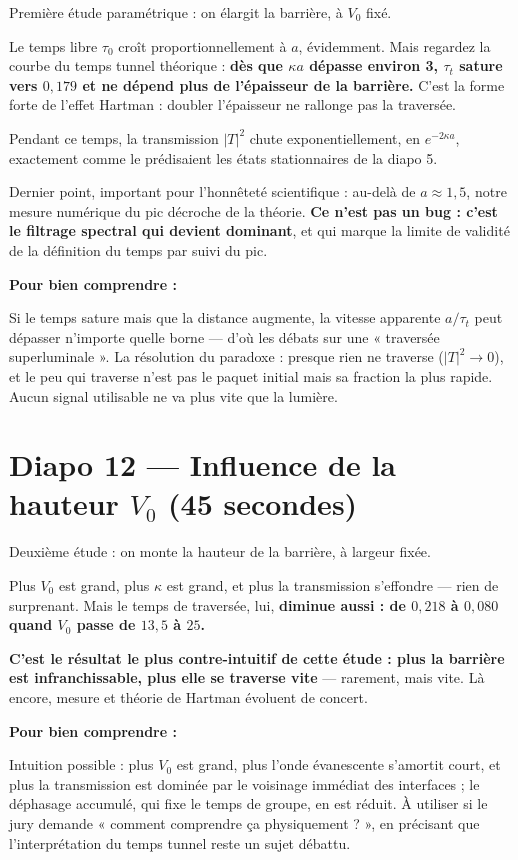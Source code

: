 \documentclass[11pt,a4paper]{article}
\newcommand{\diapo}[2]{\section*{Diapo #1 --- #2}}
\newenvironment{comprendre}%
{\par\medskip\noindent\hrulefill\par\nopagebreak\textbf{Pour bien comprendre :}\itshape\par}%
{\par\nopagebreak\noindent\hrulefill\par\medskip}
\begin{document}
	Première étude paramétrique : on élargit la barrière, à $V_0$ fixé.
	
	Le temps libre $\tau_0$ croît proportionnellement à $a$, évidemment. Mais regardez
	la courbe du temps tunnel théorique : \textbf{dès que $\kappa a$ dépasse environ
		3, $\tau_t$ sature vers $0{,}179$ et ne dépend plus de l'épaisseur de la
		barrière.} C'est la forme forte de l'effet Hartman : doubler l'épaisseur ne
	rallonge pas la traversée.
	
	Pendant ce temps, la transmission $|T|^2$ chute exponentiellement, en
	$e^{-2\kappa a}$, exactement comme le prédisaient les états stationnaires de la
	diapo 5.
	
	Dernier point, important pour l'honnêteté scientifique : au-delà de
	$a \approx 1{,}5$, notre mesure numérique du pic décroche de la théorie.
	\textbf{Ce n'est pas un bug : c'est le filtrage spectral qui devient dominant},
	et qui marque la limite de validité de la définition du temps par suivi du pic.
	
	\begin{comprendre}
		Si le temps sature mais que la distance augmente, la vitesse apparente $a/\tau_t$
		peut dépasser n'importe quelle borne --- d'où les débats sur une « traversée
		superluminale ». La résolution du paradoxe : presque rien ne traverse
		($|T|^2 \to 0$), et le peu qui traverse n'est pas le paquet initial mais sa
		fraction la plus rapide. Aucun signal utilisable ne va plus vite que la lumière.
	\end{comprendre}
	
	\diapo{12}{Influence de la hauteur $V_0$ (45 secondes)}
	
	Deuxième étude : on monte la hauteur de la barrière, à largeur fixée.
	
	Plus $V_0$ est grand, plus $\kappa$ est grand, et plus la transmission
	s'effondre --- rien de surprenant. Mais le temps de traversée, lui,
	\textbf{diminue aussi : de $0{,}218$ à $0{,}080$ quand $V_0$ passe de $13{,}5$ à
		$25$.}
	
	\textbf{C'est le résultat le plus contre-intuitif de cette étude : plus la
		barrière est infranchissable, plus elle se traverse vite} --- rarement, mais
	vite. Là encore, mesure et théorie de Hartman évoluent de concert.
	
	\begin{comprendre}
		Intuition possible : plus $V_0$ est grand, plus l'onde évanescente s'amortit
		court, et plus la transmission est dominée par le voisinage immédiat des
		interfaces ; le déphasage accumulé, qui fixe le temps de groupe, en est réduit.
		À utiliser si le jury demande « comment comprendre ça physiquement ? », en
		précisant que l'interprétation du temps tunnel reste un sujet débattu.
	\end{comprendre}
	
\end{document}
